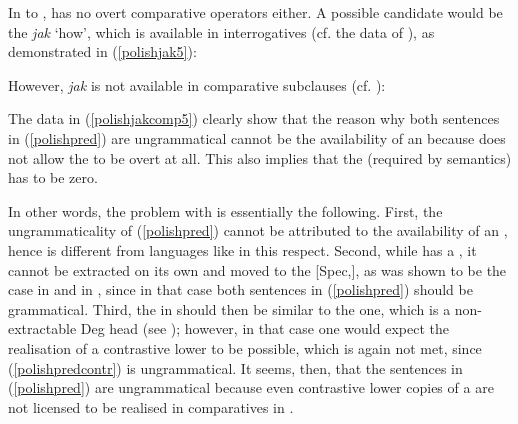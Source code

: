 In  to ,  has no overt comparative operators either. A possible candidate would be the   \textit{jak} `how', which is available in interrogatives (cf. the data of \citealt[81]{borsleyjaworska1981}), as demonstrated in (\ref{polishjak5}):

\ea \label{polishjak5}
\z
\z

However, \textit{jak} is not available in comparative subclauses (cf. \citealt{bacskaiatkari2015fdsl}):

\ea \label{polishjakcomp5}
\z
\z

The data in (\ref{polishjakcomp5}) clearly show that the reason why both sentences in (\ref{polishpred}) are ungrammatical cannot be the availability of an  because  does not allow the  to be overt at all. This also implies that the  (required by  semantics) has to be zero.

In other words, the problem with  is essentially the following. First, the ungrammaticality of (\ref{polishpred}) cannot be attributed to the availability of an , hence  is different from languages like  in this respect. Second, while  has a , it cannot be extracted on its own and moved to the [Spec,], as was shown to be the case in  and  in , since in that case both sentences in (\ref{polishpred}) should be grammatical. Third, the  in  should then be similar to the  one, which is a non-extractable Deg head (see ); however, in that case one would expect the realisation of a contrastive lower  to be possible, which is again not met, since (\ref{polishpredcontr}) is ungrammatical. It seems, then, that the sentences in (\ref{polishpred}) are ungrammatical because even contrastive lower copies of a  are not licensed to be realised in comparatives in .

